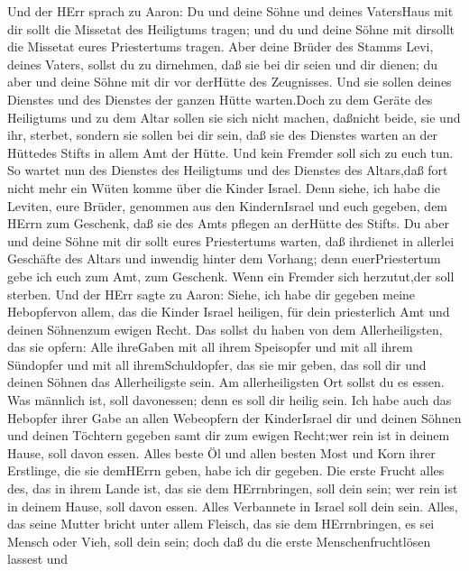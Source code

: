  Und der HErr sprach zu Aaron: Du und deine Söhne und deines
VatersHaus mit dir sollt die Missetat des Heiligtums tragen; und du und
deine Söhne mit dirsollt die Missetat eures Priestertums tragen.
 Aber deine Brüder des Stamms Levi, deines Vaters, sollst du
zu dirnehmen, daß sie bei dir seien und dir dienen; du aber und deine
Söhne mit dir vor derHütte des Zeugnisses.  Und sie sollen
deines Dienstes und des Dienstes der ganzen Hütte warten.Doch zu dem
Geräte des Heiligtums und zu dem Altar sollen sie sich nicht machen,
daßnicht beide, sie und ihr, sterbet,  sondern sie sollen
bei dir sein, daß sie des Dienstes warten an der Hüttedes Stifts in
allem Amt der Hütte. Und kein Fremder soll sich zu euch tun.
 So wartet nun des Dienstes des Heiligtums und des Dienstes
des Altars,daß fort nicht mehr ein Wüten komme über die Kinder Israel.
 Denn siehe, ich habe die Leviten, eure Brüder, genommen aus
den KindernIsrael und euch gegeben, dem HErrn zum Geschenk, daß sie des
Amts pflegen an derHütte des Stifts.  Du aber und deine
Söhne mit dir sollt eures Priestertums warten, daß ihrdienet in allerlei
Geschäfte des Altars und inwendig hinter dem Vorhang; denn
euerPriestertum gebe ich euch zum Amt, zum Geschenk. Wenn ein Fremder
sich herzutut,der soll sterben.  Und der HErr sagte zu
Aaron: Siehe, ich habe dir gegeben meine Hebopfervon allem, das die
Kinder Israel heiligen, für dein priesterlich Amt und deinen Söhnenzum
ewigen Recht.  Das sollst du haben von dem Allerheiligsten,
das sie opfern: Alle ihreGaben mit all ihrem Speisopfer und mit all
ihrem Sündopfer und mit all ihremSchuldopfer, das sie mir geben, das
soll dir und deinen Söhnen das Allerheiligste sein.  Am
allerheiligsten Ort sollst du es essen. Was männlich ist, soll
davonessen; denn es soll dir heilig sein.  Ich habe auch
das Hebopfer ihrer Gabe an allen Webeopfern der KinderIsrael dir und
deinen Söhnen und deinen Töchtern gegeben samt dir zum ewigen Recht;wer
rein ist in deinem Hause, soll davon essen.  Alles beste Öl
und allen besten Most und Korn ihrer Erstlinge, die sie demHErrn geben,
habe ich dir gegeben.  Die erste Frucht alles des, das in
ihrem Lande ist, das sie dem HErrnbringen, soll dein sein; wer rein ist
in deinem Hause, soll davon essen.  Alles Verbannete in
Israel soll dein sein.  Alles, das seine Mutter bricht
unter allem Fleisch, das sie dem HErrnbringen, es sei Mensch oder Vieh,
soll dein sein; doch daß du die erste Menschenfruchtlösen lassest und

